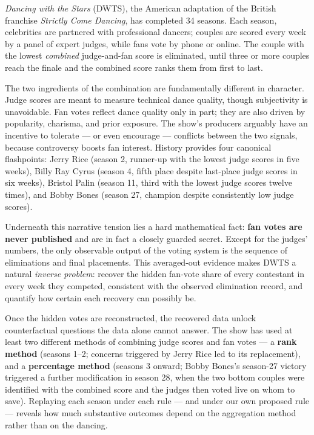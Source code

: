 \documentclass[11pt]{article}
\begin{document}
\emph{Dancing with the Stars} (DWTS), the American adaptation of the British
franchise \emph{Strictly Come Dancing}, has completed 34 seasons. Each season,
celebrities are partnered with professional dancers; couples are scored
every week by a panel of expert judges, while fans vote by phone or online.
The couple with the lowest \emph{combined} judge-and-fan score is eliminated,
until three or more couples reach the finale and the combined score ranks
them from first to last.

The two ingredients of the combination are fundamentally different in
character. Judge scores are meant to measure technical dance quality, though
subjectivity is unavoidable. Fan votes reflect dance quality only in part;
they are also driven by popularity, charisma, and prior exposure. The show's
producers arguably have an incentive to tolerate --- or even encourage ---
conflicts between the two signals, because controversy boosts fan interest.
History provides four canonical flashpoints: Jerry Rice (season 2, runner-up
with the lowest judge scores in five weeks), Billy Ray Cyrus (season 4,
fifth place despite last-place judge scores in six weeks), Bristol Palin
(season 11, third with the lowest judge scores twelve times), and Bobby
Bones (season 27, champion despite consistently low judge scores).

Underneath this narrative tension lies a hard mathematical fact:
\textbf{fan votes are never published} and are in fact a closely guarded
secret. Except for the judges' numbers, the only observable output of the
voting system is the sequence of eliminations and final placements. This
averaged-out evidence makes DWTS a natural \emph{inverse problem}: recover
the hidden fan-vote share of every contestant in every week they competed,
consistent with the observed elimination record, and quantify how certain
each recovery can possibly be.

Once the hidden votes are reconstructed, the recovered data unlock
counterfactual questions the data alone cannot answer. The show has used at
least two different methods of combining judge scores and fan votes --- a
\textbf{rank method} (seasons 1--2; concerns triggered by Jerry Rice led to
its replacement), and a \textbf{percentage method} (seasons 3 onward;
Bobby Bones's season-27 victory triggered a further modification in season 28,
when the two bottom couples were identified with the combined score and the
judges then voted live on whom to save). Replaying each season under each
rule --- and under our own proposed rule --- reveals how much substantive
outcomes depend on the aggregation method rather than on the dancing.
\end{document}
